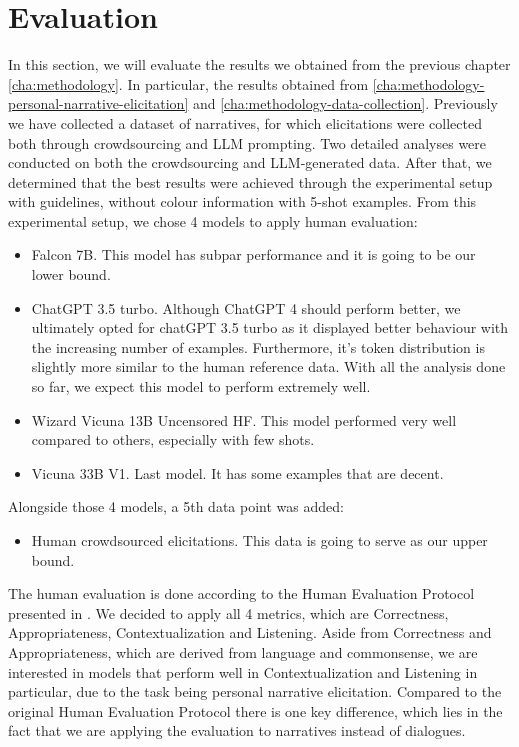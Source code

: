 \chapter{Evaluation}
\label{cha:evaluation}

In this section, we will evaluate the results we obtained from the previous chapter \ref{cha:methodology}. In particular, the results obtained from \ref{cha:methodology-personal-narrative-elicitation} and \ref{cha:methodology-data-collection}. 
Previously we have collected a dataset of narratives, for which elicitations were collected both through crowdsourcing and LLM prompting.
Two detailed analyses were conducted on both the crowdsourcing and LLM-generated data. After that, we determined that the best results were achieved through the experimental setup with guidelines, without colour information with 5-shot examples. 
From this experimental setup, we chose 4 models to apply human evaluation:
\begin{itemize}
    \item Falcon 7B. This model has subpar performance and it is going to be our lower bound.
    \item ChatGPT 3.5 turbo. Although ChatGPT 4 should perform better, we ultimately opted for chatGPT 3.5 turbo as it displayed better behaviour with the increasing number of examples. Furthermore, it's token distribution is slightly more similar to the human reference data. With all the analysis done so far, we expect this model to perform extremely well.
    \item Wizard Vicuna 13B Uncensored HF. This model performed very well compared to others, especially with few shots.
    \item Vicuna 33B V1. Last model. It has some examples that are decent.
\end{itemize}
Alongside those 4 models, a 5th data point was added:
\begin{itemize}
    \item Human crowdsourced elicitations. This data is going to serve as our upper bound.
\end{itemize}
The human evaluation is done according to the Human Evaluation Protocol presented in \cite{mousavi-etal-2022-evaluation}. We decided to apply all 4 metrics, which are Correctness, Appropriateness, Contextualization and Listening. Aside from Correctness and Appropriateness, which are derived from language and commonsense, we are interested in models that perform well in Contextualization and Listening in particular, due to the task being personal narrative elicitation. Compared to the original Human Evaluation Protocol there is one key difference, which lies in the fact that we are applying the evaluation to narratives instead of dialogues. 


